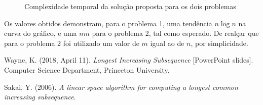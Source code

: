 \documentclass[12pt]{article}
\begin{document}
\begin{figure}[h]
    \centering
    \qquad
    \caption{Complexidade temporal da solução proposta para os dois problemas}
    \label{fig:graph-problem-1-2}
\end{figure}
\vspace{0.5mm}

Os valores obtidos demonstram, para o problema 1, uma tendência $n\log{n}$ na curva do gráfico, e uma $nm$ para o problema 2, tal como esperado. De realçar que para o problema 2 foi utilizado um valor de $m$ igual ao de $n$, por simplicidade.

\begin{thebibliography}{2}
    Wayne, K. (2018, April 11). \textit{Longest Increasing Subsequence} [PowerPoint slides]. Computer Science Department, Princeton University.

    Sakai, Y. (2006). \textit{A linear space algorithm for computing a longest common increasing subsequence}.
\end{thebibliography}
\end{document}
